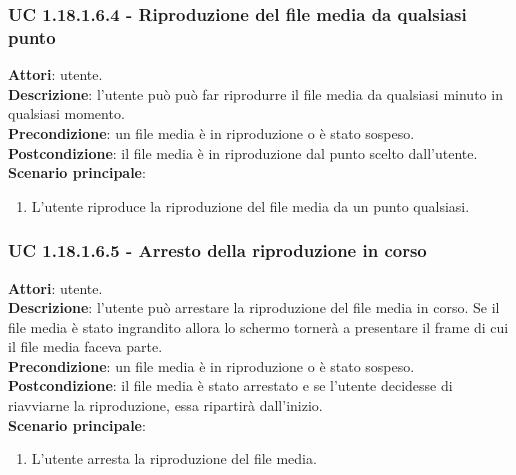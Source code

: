 	\subsubsection{UC 1.18.1.6.4 - Riproduzione del file media da qualsiasi punto}{
		\label{uc1.18.1.6.4}
		\textbf{Attori}: utente. \\
		\textbf{Descrizione}: l'utente può può far riprodurre il file media da qualsiasi minuto in qualsiasi momento. \\
		\textbf{Precondizione}: un file media è in riproduzione o è stato sospeso.	\\
		\textbf{Postcondizione}: il file media è in riproduzione dal punto scelto dall'utente.\\
		\textbf{Scenario principale}:
		\begin{enumerate}
			\item L'utente riproduce la riproduzione del file media da un punto qualsiasi.
		\end{enumerate}		
	}
	\subsubsection{UC 1.18.1.6.5 - Arresto della riproduzione in corso}{
		\label{uc1.18.1.6.5}
		\textbf{Attori}: utente. \\
		\textbf{Descrizione}: l'utente può arrestare la riproduzione del file media in corso. Se il file media è stato ingrandito allora lo schermo tornerà a presentare il frame di cui il file media faceva parte. \\
		\textbf{Precondizione}: un file media è in riproduzione o è stato sospeso.	\\
		\textbf{Postcondizione}: il file media è stato arrestato e se l'utente decidesse di riavviarne la riproduzione, essa ripartirà dall'inizio.\\
		\textbf{Scenario principale}:
		\begin{enumerate}
			\item L'utente arresta la riproduzione del file media.
		\end{enumerate}		
	}
